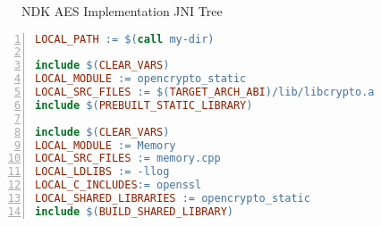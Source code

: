 \begin{appendices}
\begin{figure}[htb]
\caption[NDK AES Implementation JNI Tree]{NDK AES Implementation JNI Tree}
\label{fig:ndk_aes_impl_tree}
\end{figure}
\begin{lstlisting}[language=make, caption=Memory/Android.mk, label=nkd_aes_make, numbers=left]
LOCAL_PATH := $(call my-dir)

include $(CLEAR_VARS)
LOCAL_MODULE := opencrypto_static
LOCAL_SRC_FILES := $(TARGET_ARCH_ABI)/lib/libcrypto.a
include $(PREBUILT_STATIC_LIBRARY)

include $(CLEAR_VARS)
LOCAL_MODULE := Memory
LOCAL_SRC_FILES := memory.cpp
LOCAL_LDLIBS := -llog
LOCAL_C_INCLUDES:= openssl
LOCAL_SHARED_LIBRARIES := opencrypto_static
include $(BUILD_SHARED_LIBRARY)
\end{lstlisting}


\end{appendices}
